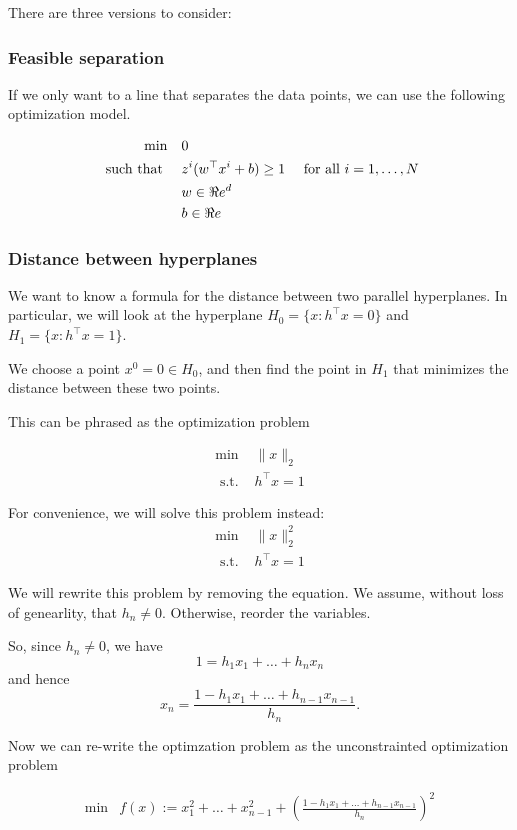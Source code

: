 There are three versions to consider:

\subsubsection{Feasible separation}

If we only want to a line that separates the data points, we can use the following optimization model.

\begin{align*}
\min \quad & 0 \\
\mbox{ such that } \quad & z^i( w^\top x^i + b) \geq 1 & \mbox{ for all } i=1, \dots, N\\
& w  \in \Re e^d\\
& b \in \Re e
\end{align*}
\subsubsection{Distance between hyperplanes}

We want to know a formula for the distance between two parallel hyperplanes.   In particular, we will look at the hyperplane $H_0 = \{ x :  h^\top x = 0\}$ and $H_1 = \{x : h^\top x = 1\}$.

We choose a point $x^0 = 0 \in H_0$, and then find the point in $H_1$ that minimizes the distance between these two points.

This can be phrased as the optimization problem

\begin{align*}
\min &  \|x \|_2\\
 \text{ s.t. } & h^\top x = 1
\end{align*}

For convenience, we will solve this problem instead:
\begin{align*}
\min &  \|x \|_2^2\\
 \text{ s.t. } & h^\top x = 1
\end{align*}

We will rewrite this problem by removing the equation.   We assume, without loss of genearlity, that $h_n \neq 0$.  Otherwise, reorder the variables.

So, since $h_n \neq 0$, we have 
$$
1 = h_1 x_1 + \dots + h_n x_n
$$
and hence
$$
x_n = \frac{1 - h_1 x_1 + \dots + h_{n-1}x_{n-1}}{h_n}.
$$

Now we can re-write the optimzation problem as the unconstrainted optimization problem 

\begin{align*}
\min &  f(x) := x_1^2 + \dots + x_{n-1}^2 + \left( \frac{1 - h_1 x_1 + \dots + h_{n-1}x_{n-1}}{h_n}\right)^2\\
\end{align*}

